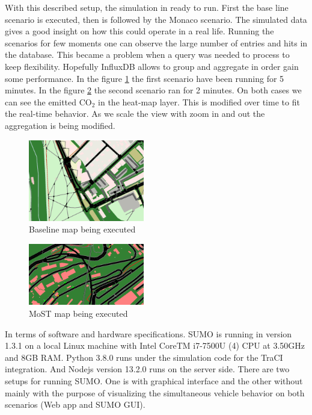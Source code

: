 \documentclass[letter, 10pt, conference]{ieeeconf}
\begin{document}
With this described setup, the simulation in ready to run.
First the base line scenario is executed, then is followed by the Monaco scenario.
The simulated data gives a good insight on how this could operate in a real life.
Running the scenarios for few moments one can observe the large number of entries and hits in the database.
This became a problem when a query was needed to process to keep flexibility.
Hopefully InfluxDB allows to group and aggregate in order gain some performance.
In the figure \ref{fig:map3} the first scenario have been running for 5 minutes.
In the figure \ref{fig:map4} the second scenario ran for 2 minutes.
On both cases we can see the emitted CO$_2$ in the heat-map layer.
This is modified over time to fit the real-time behavior.
As we scale the view with zoom in and out the aggregation is being modified.

\begin{figure}[h]
  \centering
  \includegraphics[width=0.45\textwidth]{map3}
  \caption{Baseline map being executed}
  \label{fig:map3}
\end{figure}

\begin{figure}[h]
  \centering
  \includegraphics[width=0.45\textwidth]{map4}
  \caption{MoST map being executed}
  \label{fig:map4}
\end{figure}

In terms of software and hardware specifications. SUMO is running in version 1.3.1 on a local Linux machine with Intel CoreTM i7-7500U (4) CPU at 3.50GHz and 8GB RAM.
Python 3.8.0 runs under the simulation code for the TraCI integration.
And Nodejs version 13.2.0 runs on the server side.
There are two setups for running SUMO.
One is with graphical interface and the other without mainly with the purpose of visualizing the simultaneous vehicle behavior on both scenarios (Web app and SUMO GUI).
\end{document}
